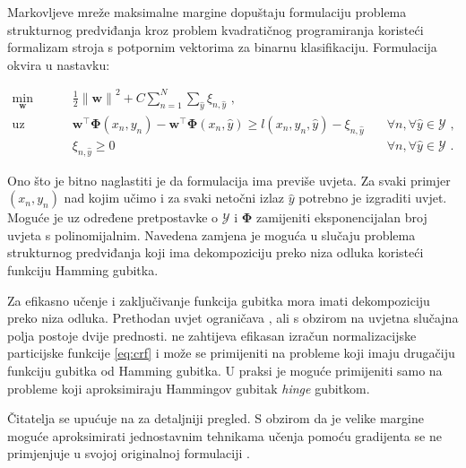 Markovljeve mreže maksimalne margine  dopuštaju formulaciju problema strukturnog predviđanja kroz
problem kvadratičnog programiranja  koristeći
formalizam stroja s potpornim vektorima za binarnu klasifikaciju. Formulacija
\mmmm{} okvira u nastavku:

\begin{equation}\label{eq:mmmm}
\begin{aligned}
  \min_{\mathbf{w}} & \quad \frac{1}{2} {\lVert\mathbf{w}\lVert}^2 + C \sum_{n=1}^{N}\sum_{\hat{y}} \xi_{n,\hat{y}} \text{ ,}              & \\
  \text{uz uvjete}  & \quad \mathbf{w}^\top \mathbf{\Phi}(x_n, y_n) - \mathbf{w}^\top \mathbf{\Phi}(x_n, \hat{y}) \ge l(x_n, y_n, \hat{y}) - \xi_{n,\hat{y}} & \quad \forall n, \forall \hat{y} \in \mathcal{Y} \text{ ,}\\
                    & \quad \xi_{n,\hat{y}} \ge 0                                                                                          & \quad \forall n, \forall \hat{y} \in \mathcal{Y} \text{ .}
\end{aligned}
\end{equation}

Ono što je bitno naglastiti je da \mmmm{} formulacija ima previše uvjeta. Za
svaki primjer $(x_n, y_n)$ nad kojim učimo i za svaki netočni izlaz $\hat{y}$
potrebno je izgraditi uvjet. Moguće je uz određene pretpostavke o $\mathcal{Y}$
i $\mathbf{\Phi}$ zamijeniti eksponencijalan broj uvjeta s polinomijalnim.
Navedena zamjena je moguća u slučaju problema strukturnog predviđanja koji ima
dekompoziciju preko niza odluka koristeći funkciju Hamming gubitka.

Za efikasno učenje i zaključivanje funkcija gubitka mora imati dekompoziciju
preko niza odluka. Prethodan uvjet ograničava \mmmm{}, ali s obzirom na uvjetna
slučajna polja postoje dvije prednosti. \mmmm{} ne zahtijeva efikasan izračun
normalizacijske particijske funkcije \ref{eq:crf} i može se primijeniti na
probleme koji imaju drugačiju funkciju gubitka od Hamming gubitka. U praksi je
moguće primijeniti \mmmm{} samo na probleme koji aproksimiraju Hammingov gubitak
\textit{hinge} gubitkom.

Čitatelja se upućuje na \citep{taskar2003maximum} za detaljniji pregled. S
obzirom da je velike margine moguće aproksimirati jednostavnim tehnikama učenja
pomoću gradijenta \mmmm{} se ne primjenjuje u svojoj originalnoj formulaciji
\citep{daume2005learning, ratliff2006maximum}.
